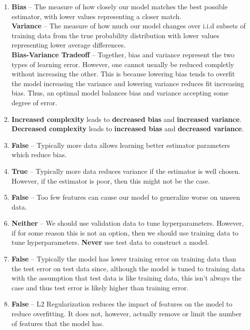 \begin{enumerate}
    \item
	{\bf Bias} -- The measure of how closely our model matches the best possible estimator, with lower values representing a closer match. \\
	{\bf Variance} -- The measure of how much our model changes over i.i.d subsets of training data from the true probability distribution with lower values representing lower average differences. \\
	{\bf Bias-Variance Tradeoff} -- Together, bias and variance represent the two types of learning error. However, one cannot usually be reduced completly without increasing the other. This is because lowering bias tends to overfit the model increasing the variance and lowering variance reduces fit increasing bias. Thus, an optimal model balances bias and variance accepting some degree of error. 
    \item {\bf Increased complexity} leads to {\bf decreased bias} and {\bf increased variance}. {\bf Decreased complexity} leads to {\bf increased bias} and {\bf decreased variance}.
    \item {\bf False} -- Typically more data allows learning better estimator parameters which reduce bias. 
    \item {\bf True} -- Typically more data reduces variance if the estimator is well chosen. However, if the estimator is poor, then this might not be the case.
    \item {\bf False} -- Too few features can cause our model to generalize worse on unseen data.
    \item {\bf Neither} -- We should use validation data to tune hyperparameters. However, if for some reason this is not an option, then we should use training data to tune hyperparameters. {\bf Never} use test data to construct a model.
    \item {\bf False} -- Typically the model has lower training error on training data than the test error on test data since, although the model is tuned to training data with the assumption that test data is like training data, this isn't always the case and thus test error is likely higher than training error.
    \item {\bf False} -- L2 Regularization reduces the impact of features on the model to reduce overfitting. It does not, however, actually remove or limit the number of features that the model has. 
\end{enumerate}
